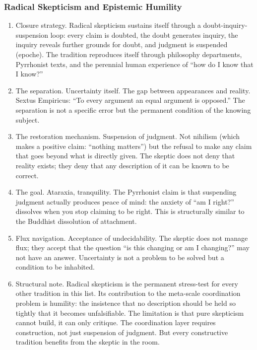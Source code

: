 \documentclass[
]{article}
\providecommand{\tightlist}{%
  \setlength{\itemsep}{0pt}\setlength{\parskip}{0pt}}
\begin{document}
\subsubsection{Radical Skepticism and Epistemic
Humility}\label{radical-skepticism-and-epistemic-humility}

\begin{enumerate}
\def\labelenumi{\arabic{enumi}.}
\setcounter{enumi}{135}
\tightlist
\item
  Closure strategy. Radical skepticism sustains itself through a
  doubt-inquiry- suspension loop: every claim is doubted, the doubt
  generates inquiry, the inquiry reveals further grounds for doubt, and
  judgment is suspended (epoche). The tradition reproduces itself
  through philosophy departments, Pyrrhonist texts, and the perennial
  human experience of ``how do I know that I know?''
\item
  The separation. Uncertainty itself. The gap between appearances and
  reality. Sextus Empiricus: ``To every argument an equal argument is
  opposed.'' The separation is not a specific error but the permanent
  condition of the knowing subject.
\item
  The restoration mechanism. Suspension of judgment. Not nihilism (which
  makes a positive claim: ``nothing matters'') but the refusal to make
  any claim that goes beyond what is directly given. The skeptic does
  not deny that reality exists; they deny that any description of it can
  be known to be correct.
\item
  The goal. Ataraxia, tranquility. The Pyrrhonist claim is that
  suspending judgment actually produces peace of mind: the anxiety of
  ``am I right?'' dissolves when you stop claiming to be right. This is
  structurally similar to the Buddhist dissolution of attachment.
\item
  Flux navigation. Acceptance of undecidability. The skeptic does not
  manage flux; they accept that the question ``is this changing or am I
  changing?'' may not have an answer. Uncertainty is not a problem to be
  solved but a condition to be inhabited.
\item
  Structural note. Radical skepticism is the permanent stress-test for
  every other tradition in this list. Its contribution to the meta-scale
  coordination problem is humility: the insistence that no description
  should be held so tightly that it becomes unfalsifiable. The
  limitation is that pure skepticism cannot build, it can only critique.
  The coordination layer requires construction, not just suspension of
  judgment. But every constructive tradition benefits from the skeptic
  in the room.
\end{enumerate}
\end{document}
